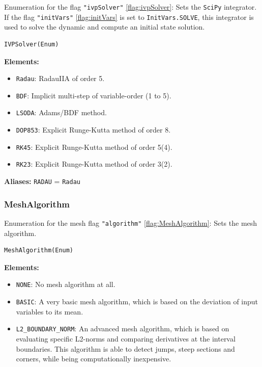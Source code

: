 \documentclass[12pt]{article}
\begin{document}
\begin{mdframed}[backgroundcolor=gray!10, roundcorner=10pt,
		linewidth=1pt]
	Enumeration for the flag \texttt{"ivpSolver"}
	\eqref{flag:ivpSolver}:
	Sets the \texttt{SciPy} integrator. If the flag
	\texttt{"initVars"} \eqref{flag:initVars} is set to
	\texttt{InitVars.SOLVE}, this
	integrator is used to solve the dynamic and compute an initial state
	solution.

	\begin{lstlisting}
IVPSolver(Enum)
		\end{lstlisting}
	\label{enum:IVPSolver}
	\textbf{Elements:}
	\begin{itemize}
		\item \texttt{Radau}: RadauIIA of order 5.
		\item \texttt{BDF}: Implicit multi-step of
		      variable-order (1 to 5).
		\item \texttt{LSODA}: Adams/BDF method.
		\item \texttt{DOP853}: Explicit Runge-Kutta method of
		      order 8.
		\item \texttt{RK45}: Explicit Runge-Kutta method of
		      order 5(4).
		\item \texttt{RK23}: Explicit Runge-Kutta method of
		      order 3(2).
	\end{itemize}

	\textbf{Aliases:} \texttt{RADAU} = \texttt{Radau}
\end{mdframed}

\subsubsection{MeshAlgorithm}

\begin{mdframed}[backgroundcolor=gray!10, roundcorner=10pt,
		linewidth=1pt]
	Enumeration for the mesh flag \texttt{"algorithm"}
	\eqref{flag:MeshAlgorithm}:
	Sets the mesh algorithm.

	\begin{lstlisting}
MeshAlgorithm(Enum)
		\end{lstlisting}
	\label{enum:MeshAlgorithm}
	\textbf{Elements:}
	\begin{itemize}
		\item \texttt{NONE}: No mesh algorithm at all.
		\item \texttt{BASIC}: A very basic mesh algorithm, which is
		      based on the deviation of input variables to its mean.
		\item \texttt{L2\_BOUNDARY\_NORM}: An advanced mesh algorithm,
		      which is based on evaluating specific L2-norms and
		      comparing derivatives at the
		      interval boundaries. This algorithm is able to detect
		      jumps, steep sections and
		      corners, while being
		      computationally inexpensive.
	\end{itemize}

\end{mdframed}
\end{document}

